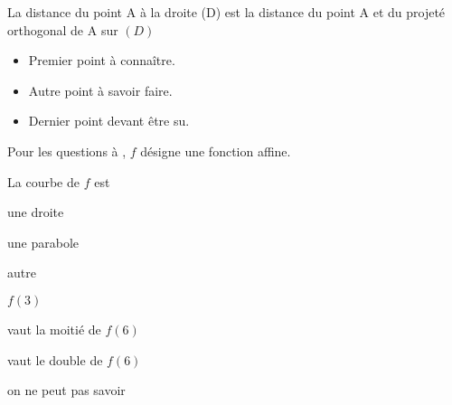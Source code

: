 \documentclass[nocrop]{sesamanuel}
\begin{document}
\begin{definition}
La distance du point A à la droite (D) est la distance du point A et du projeté orthogonal de A sur $(D)$
\end{definition}

\connaissances
\begin{acquis}
\begin{itemize}
\item  Premier  point  à  connaître.
\item  Autre  point  à  savoir  faire.
\item  Dernier  point  devant  être  su.
\end{itemize}
\end{acquis}
\begin{QCM}
\begin{EnonceCommunQCM}
Pour  les  questions    à
,  $f$  désigne  une fonction  affine.
\end{EnonceCommunQCM}
\begin{GroupeQCM}
\begin{exercice}\label{premier-qcm} La  courbe  de  $f$  est
\begin{ChoixQCM}{3}
\item  une  droite
\item  une  parabole
\item  autre
\end{ChoixQCM}
\end{exercice}
\begin{corrige}
\end{corrige}
\begin{exercice}\label{deuxieme-qcm}
$f(3)$
\begin{ChoixQCM}{3}
\item  vaut  la  moitié  de  $f(6)$
\item  vaut  le  double  de  $f(6)$
\item  on  ne  peut  pas savoir
\end{ChoixQCM}
\end{exercice}
\begin{corrige}
\end{corrige}
\end{GroupeQCM}
\end{QCM}
\end{document}
